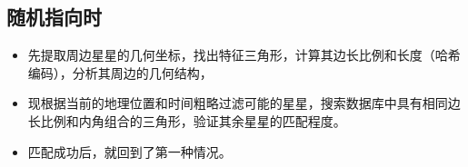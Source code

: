 \documentclass{ctexart}
\begin{document}
\subsection{随机指向时}
\begin{itemize}
    \item 先提取周边星星的几何坐标，找出特征三角形，计算其边长比例和长度（哈希编码），分析其周边的几何结构，
    \item 现根据当前的地理位置和时间粗略过滤可能的星星，搜索数据库中具有相同边长比例和内角组合的三角形，验证其余星星的匹配程度。
    \item 匹配成功后，就回到了第一种情况。
\end{itemize}
\end{document}
